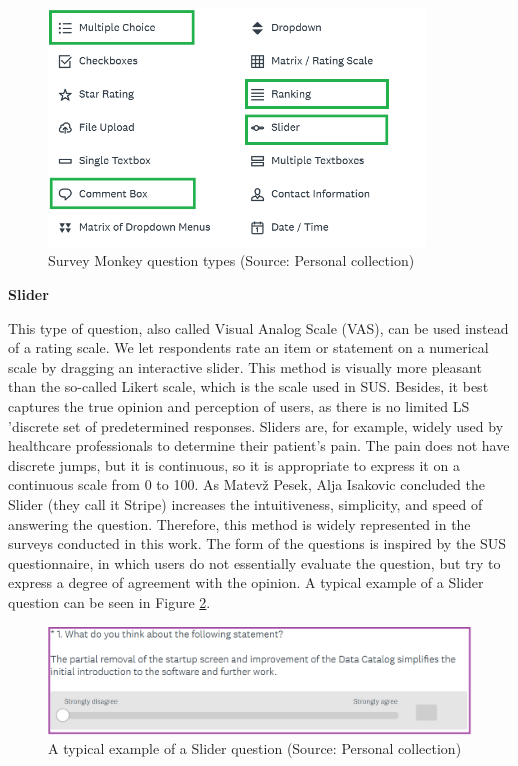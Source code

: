 \documentclass[a4paper,10pt,twoside]{article}
\begin{document}
\vspace{0.3cm}
\begin{figure}[hbt!] 
\begin{center}
\includegraphics[width=10cm]{../pictures/survey_monkey_options.png} 
\caption[Survey Monkey question types ]{Survey Monkey question types (Source: Personal collection)}
\label{fig:survey_monkey_options}
\end{center}
\end{figure}


\noindent \textbf {Slider}
\label{sec:slider}

\noindent This type of question, also called Visual Analog Scale
(VAS), can be used instead of a rating scale. We let respondents rate
an item or statement on a numerical scale by dragging an interactive
slider. This method is visually more pleasant than the so-called
Likert scale, which is the scale used in SUS. Besides, it best
captures the true opinion and perception of users, as there is no
limited LS 'discrete set of predetermined responses. Sliders are, for
example, widely used by healthcare professionals to determine their
patient's pain. The pain does not have discrete jumps, but it is
continuous, so it is appropriate to express it on a continuous scale
from 0 to 100. As Matevž Pesek, Alja Isakovic \cite{inproceedings}
concluded the Slider (they call it Stripe) increases the
intuitiveness, simplicity, and speed of answering the
question. Therefore, this method is widely represented in the surveys
conducted in this work. The form of the questions is inspired by the
SUS questionnaire, in which users do not essentially evaluate the
question, but try to express a degree of agreement with the opinion. A
typical example of a Slider question can be seen in Figure
\ref{fig:slider_question}.

\vspace{0.3cm}
\begin{figure}[hbt!] 
\begin{center}
\includegraphics[width=16cm]{../pictures/slider_question.png} 
\caption[A typical example of a Slider question]{A typical example of a Slider question (Source: Personal collection)}
\label{fig:slider_question}
\end{center}
\end{figure}
\end{document}

